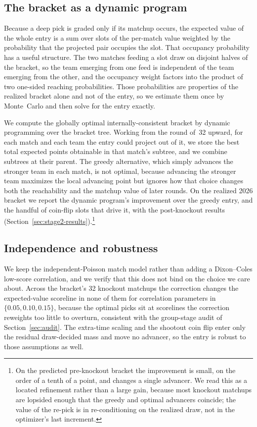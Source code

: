 \subsection{The bracket as a dynamic program}\label{sec:stage2-dp}

Because a deep pick is graded only if its matchup occurs, the expected value of
the whole entry is a sum over slots of the per-match value weighted by the
probability that the projected pair occupies the slot. That occupancy
probability has a useful structure. The two matches feeding a slot draw on
disjoint halves of the bracket, so the team emerging from one feed is
independent of the team emerging from the other, and the occupancy weight
factors into the product of two one-sided reaching probabilities. Those
probabilities are properties of the realized bracket alone and not of the
entry, so we estimate them once by Monte~Carlo and then solve for the entry
exactly.

We compute the globally optimal internally-consistent bracket by dynamic
programming over the bracket tree. Working from the round of~32 upward, for each
match and each team the entry could project out of it, we store the best total
expected points obtainable in that match's subtree, and we combine subtrees at
their parent. The greedy alternative, which simply advances the stronger team in
each match, is not optimal, because advancing the stronger team maximizes the
local advancing point but ignores how that choice changes both the reachability
and the matchup value of later rounds. On the realized 2026 bracket we report the
dynamic program's improvement over the greedy entry, and the handful of
coin-flip slots that drive it, with the post-knockout results
(Section~\ref{sec:stage2-results}).\footnote{On the predicted pre-knockout
bracket the improvement is small, on the order of a tenth of a point, and
changes a single advancer. We read this as a located refinement rather than a
large gain, because most knockout matchups are lopsided enough that the greedy
and optimal advancers coincide; the value of the re-pick is in re-conditioning on
the realized draw, not in the optimizer's last increment.}

\subsection{Independence and robustness}\label{sec:stage2-robust}

We keep the independent-Poisson match model rather than adding a Dixon--Coles
low-score correlation, and we verify that this does not bind on the choice we
care about. Across the bracket's 32 knockout matchups the correction changes the
expected-value scoreline in none of them for correlation parameters in
$\{0.05, 0.10, 0.15\}$, because the optimal picks sit at scorelines the
correction reweights too little to overturn, consistent with the group-stage
audit of Section~\ref{sec:audit}. The extra-time scaling and the shootout coin
flip enter only the residual draw-decided mass and move no advancer, so the entry
is robust to those assumptions as well.

